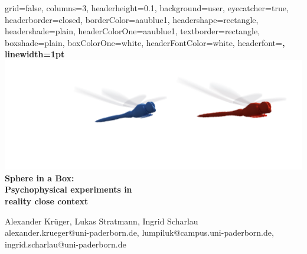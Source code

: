 \documentclass[a0paper,portrait]{baposter}
\begin{document}

\begin{poster}{
  grid=false,
  columns=3,
  headerheight=0.1\textheight,
  background=user,
  eyecatcher=true,
  headerborder=closed,
  borderColor=aaublue1,
  headershape=rectangle,
  headershade=plain, %
  headerColorOne=aaublue1,
  textborder=rectangle,
  boxshade=plain,
  boxColorOne=white,
  headerFontColor=white,
  headerfont=\Large\sf\bf,
  linewidth=1pt
}
{
 \vspace*{-1cm} \includegraphics[height=.9\headerheight]{UPB_Logo_WEISS_12_libellen2.pdf}
}
{\color{white}\bf\smaller
  Sphere in a Box: \\ 
  Psychophysical experiments in \\ reality close context
}
{\color{white}\small
\vspace*{-0.2cm}
  \vspace{1em}Alexander Kr{\"u}ger, Lukas Stratmann,  Ingrid Scharlau\\
  {\smaller alexander.krueger@uni-paderborn.de, lumpiluk@campus.uni-paderborn.de, ingrid.scharlau@uni-paderborn.de}
  
}
\end{poster}
\end{document}
